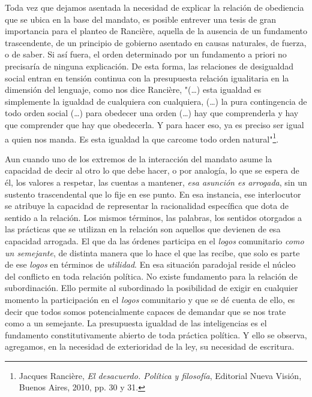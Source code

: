 Toda vez que dejamos asentada la necesidad de explicar la relación de
obediencia que se ubica en la base del mandato, es posible entrever una
tesis de gran importancia para el planteo de Rancière, aquella de la
ausencia de un fundamento trascendente, de un principio de gobierno
asentado en causas naturales, de fuerza, o de saber. Si así fuera, el
orden determinado por un fundamento a priori no precisaría de ninguna
explicación. De esta forma, las relaciones de desigualdad social entran
en tensión continua con la presupuesta relación igualitaria en la
dimensión del lenguaje, como nos dice Rancière, "(\dots) esta
igualdad es simplemente la igualdad de cualquiera con cualquiera,
(\dots) la pura contingencia de todo orden social (\dots) para
obedecer una orden (\dots) hay que comprenderla y hay que
comprender que hay que obedecerla. Y para hacer eso, ya es preciso ser
igual a quien nos manda. Es esta igualdad la que carcome todo orden
natural"\footnote{Jacques Rancière, \emph{El desacuerdo. Política y
  filosofía}, Editorial Nueva Visión, Buenos Aires, 2010, pp. 30 y 31.}.

Aun cuando uno de los extremos de la interacción del mandato asume la
capacidad de decir al otro lo que debe hacer, o por analogía, lo que se
espera de él, los valores a respetar, las cuentas a mantener, \emph{esa
asunción es arrogada}, sin un sustento trascendental que lo fije en ese
punto. En esa instancia, ese interlocutor se atribuye la capacidad de
representar la racionalidad específica que dota de sentido a la
relación. Los mismos términos, las palabras, los sentidos otorgados a
las prácticas que se utilizan en la relación son aquellos que devienen
de esa capacidad arrogada. El que da las órdenes participa en el
\emph{logos} comunitario \emph{como un semejante}, de distinta manera
que lo hace el que las recibe, que solo es parte de ese \emph{logos} en
términos de \emph{utilidad}. En esa situación paradojal reside el núcleo
del conflicto en toda relación política. No existe fundamento para la
relación de subordinación. Ello permite al subordinado la posibilidad de
exigir en cualquier momento la participación en el \emph{logos}
comunitario y que se dé cuenta de ello, es decir que todos somos
potencialmente capaces de demandar que se nos trate como a un semejante.
La presupuesta igualdad de las inteligencias es el fundamento
constitutivamente abierto de toda práctica política. Y ello se observa,
agregamos, en la necesidad de exterioridad de la ley, su necesidad de
escritura.

